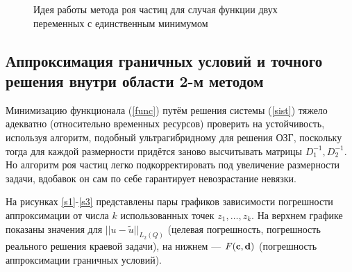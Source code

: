 \documentclass[a4paper]{article}
\begin{document}
\begin{figure}[h!]
  \caption{Идея работы метода роя частиц для случая функции двух переменных с единственным минимумом}
  \label{parab}
\end{figure}

\subsection{Аппроксимация граничных условий и точного решения внутри области 2-м методом}
Минимизацию функционала (\ref{func}) путём решения системы (\ref{sist}) тяжело адекватно (относительно временных ресурсов) проверить на устойчивость,
используя алгоритм, подобный ультрагибридному для решения ОЗГ, поскольку тогда для каждой размерности придётся заново высчитывать матрицы $D_1^{-1}, D_2^{-1}$.
Но алгоритм роя частиц легко подкорректировать под увеличение размерности задачи, вдобавок он сам по себе гарантирует невозрастание невязки.

На рисунках \ref{s1}-\ref{s3} представлены пары графиков зависимости погрешности аппроксимации от числа $k$ использованных точек $z_1,\dots, z_k$.
На верхнем графике показаны значения для $||u - \tilde{u} ||_{L_2(Q)}$ (целевая погрешность, погрешность реального решения краевой задачи), на нижнем --- $F({\bf c},{\bf d})$ (погрешность аппроксимации граничных условий).
\end{document}
